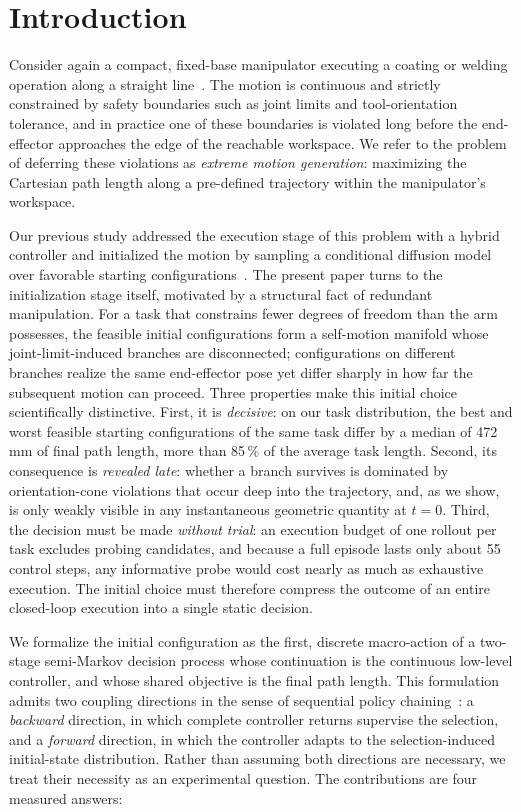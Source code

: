 \documentclass{svproc}
\begin{document}
\section{Introduction}
\label{sec:intro}
Consider again a compact, fixed-base manipulator executing a coating or
welding operation along a straight line~\cite{yuan2026extreme}. The motion is
continuous and strictly constrained by safety boundaries such as joint limits
and tool-orientation tolerance, and in practice one of these boundaries is
violated long before the end-effector approaches the edge of the reachable
workspace. We refer to the problem of deferring these violations as
\textit{extreme motion generation}: maximizing the Cartesian path length along
a pre-defined trajectory within the manipulator's workspace.

Our previous study addressed the execution stage of this problem with a hybrid
controller and initialized the motion by sampling a conditional diffusion
model over favorable starting configurations~\cite{yuan2026extreme}. The
present paper turns to the initialization stage itself, motivated by a
structural fact of redundant manipulation. For a task that constrains fewer
degrees of freedom than the arm possesses, the feasible initial configurations
form a self-motion manifold whose joint-limit-induced branches are
disconnected; configurations on different branches realize the same
end-effector pose yet differ sharply in how far the subsequent motion can
proceed. Three properties make this initial choice scientifically distinctive.
First, it is \textit{decisive}: on our task distribution, the best and worst
feasible starting configurations of the same task differ by a median of
472\,mm of final path length, more than 85\,\% of the average task length.
Second, its consequence is \textit{revealed late}: whether a branch survives
is dominated by orientation-cone violations that occur deep into the
trajectory, and, as we show, is only weakly visible in any instantaneous
geometric quantity at $t{=}0$. Third, the decision must be made
\textit{without trial}: an execution budget of one rollout per task excludes
probing candidates, and because a full episode lasts only about 55 control
steps, any informative probe would cost nearly as much as exhaustive
execution. The initial choice must therefore compress the outcome of an entire
closed-loop execution into a single static decision.

We formalize the initial configuration as the first, discrete macro-action of
a two-stage semi-Markov decision process whose continuation is the continuous
low-level controller, and whose shared objective is the final path length.
This formulation admits two coupling directions in the sense of sequential
policy chaining~\cite{chen2023sequential}: a \textit{backward} direction, in
which complete controller returns supervise the selection, and a
\textit{forward} direction, in which the controller adapts to the
selection-induced initial-state distribution. Rather than assuming both
directions are necessary, we treat their necessity as an experimental
question. The contributions are four measured answers:
\end{document}
